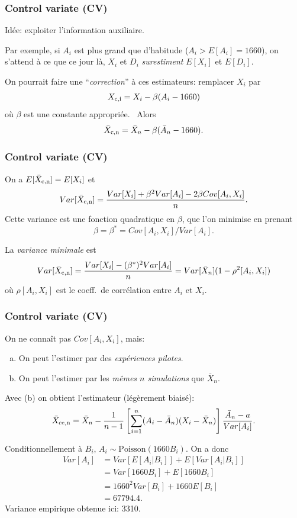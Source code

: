 \documentclass[t,usepdftitle=false]{beamer}
\begin{document}
\begin{frame}
	\frametitle{Control variate (CV)}
	
	Idée: exploiter l'information auxiliaire.
	
	\mbox{}
	
	Par exemple, si ${A_i}$ est plus grand que d'habitude ($A_i > E[A_i] = 1660$),
	on s'attend \`a ce que ce jour l\`a, $X_i$ et $D_i$
	\emph{surestiment} $E[X_i]$ et $E[D_i]$.
	
	\mbox{}
	
	On pourrait faire une ``\emph{correction}'' \`a ces estimateurs:
	remplacer $X_i$ par
	$$ X_{\rm{c},i} = X_i - {\beta} (A_i - 1660) $$
	o\`u $\beta$ est une constante appropriée.  \ Alors
	\[
	{\bar X_{\rm{c},n}} = \bar X_n - \beta (\bar A_n - 1660).
	\]
	
\end{frame}

\begin{frame}
	\frametitle{Control variate (CV)}
	
	On a $E[\bar X_{\rm{c},n}] = E[X_i]$ et 
	$$ Var[\bar X_{\rm{c},n}] 
	= \frac{Var[X_i] + \beta^2Var[A_i] - 2 \beta Cov[A_i,X_i]}{n}. $$ 
	Cette variance est une fonction quadratique en $\beta$, que l'on minimise
	en prenant
	\[
	\beta = {\beta^*} = Cov[A_i, X_i] / Var[A_i].
	\]
	
	\mbox{}
	
	La \emph{variance minimale} est
	$$ Var[\bar X_{\rm{c},n}] = \frac{Var[X_i] - (\beta^*)^2 Var[A_i]}{n}
	= Var[\bar X_n] (1- \rho^2[A_i,X_i]) $$
	o\`u ${\rho[A_i, X_i]}$ est le coeff.\ de corrélation entre 
	$A_i$ et $X_i$.
	
\end{frame}

\begin{frame}
	\frametitle{Control variate (CV)}
	
	On ne connaît pas $Cov[A_i, X_i]$, mais:
	\begin{enumerate}[(a)]
		\item
		On peut l'estimer par des \emph{expériences pilotes}.
		\item
		On peut l'estimer par les \emph{m\^emes $n$ simulations} que $\bar X_n$.
	\end{enumerate}
	
	\mbox{}
	
	Avec (b) on obtient l'estimateur (légèrement biaisé):
	\[
	\bar X_{\rm{c}e,n} = \bar X_n - {1\over n-1} \left[\sum_{i=1}^n
	(A_i-\bar A_n)(X_i-\bar X_n)\right] {\bar A_n - a\over Var[A_i]}.
	\]
	
	\mbox{}
	
	Conditionnellement \`a $B_i$, $A_i\sim\mbox{Poisson}(1660 B_i)$.  On a donc
	\begin{align*}
		{Var[A_i]} &= Var[E[A_i|B_i]] + E[Var[A_i|B_i]] \\
		&= Var[1660 B_i] + E[1660 B_i] \\
		&= 1660^2 Var[B_i] + 1660 E[B_i] \\
		&= 67794.4.
	\end{align*}
	Variance empirique obtenue ici: {3310}.
	
\end{frame}
\end{document}
